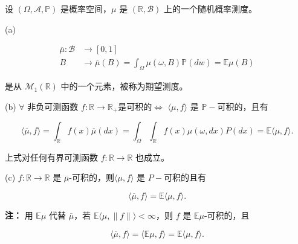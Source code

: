 \begin{theorem}
    设 \((\Omega, \mathcal{A},\mathbb{P})\) 是概率空间，\(\mu\) 是 \((\mathbb{R}, \mathcal{B})\) 上的一个随机概率测度。

(a)

\begin{equation*}
\begin{aligned}
    \overline{\mu}: \mathcal{B} &\to [0,1]\\
    B &\to \overline{\mu}(B) = \int_{\Omega} \mu(\omega, B) \mathbb{P}(dw) = \mathbb{E}\mu(B)
\end{aligned}
\end{equation*}

是从 \(\mathcal{M}_1(\mathbb{R})\) 中的一个元素，被称为期望测度。

(b) \(\forall\) 非负可测函数 \(f: \mathbb{R} \to \mathbb{R}_+\)是可积的$\iff$
$\langle \mu, f \rangle$ 是 $\mathbb{P}-$可积的，且有


\begin{equation*}
\langle \overline{\mu}, f \rangle = \int_{\mathbb{R}} f(x) \overline{\mu}(dx)
= \int_{\Omega} \int_{\mathbb{R}} f(x) \mu(\omega, dx) P(dx) = \mathbb{E} \langle \mu, f \rangle.
\end{equation*}

上式对任何有界可测函数 \(f: \mathbb{R} \to \mathbb{R}\) 也成立。

(c) \(f:  \mathbb{R} \to  \mathbb{R}\) 是 \(\overline{\mu}\)-可积的，则\(\langle \mu, f \rangle\) 是 \(P-\)可积的且有

\begin{equation*}
\langle \overline{\mu}, f \rangle = \mathbb{E} \langle \mu, f \rangle.
\end{equation*}

\textbf{注：} 用 \(\mathbb{E}\mu\) 代替 \(\overline{\mu}\)，若 \(\mathbb{E} \langle \mu, \|f\| \rangle < \infty\)，则 \(f\) 是 \(\mathbb{E}\mu\)-可积的，且

\begin{equation*}
\langle \overline{\mu}, f \rangle = \langle \mathbb{E}\mu, f \rangle = \mathbb{E} \langle \mu, f \rangle.
\end{equation*}
\end{theorem}

